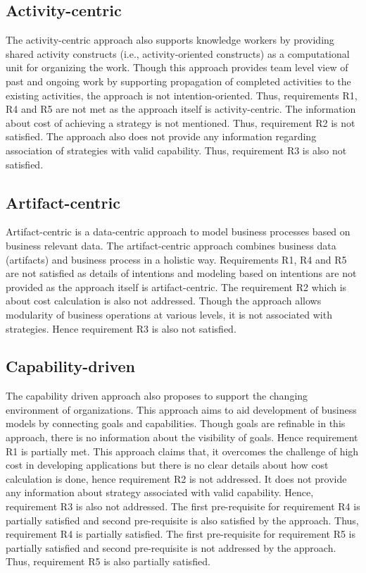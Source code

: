 \subsection{Activity-centric} 
The activity-centric approach also supports knowledge workers by providing shared activity constructs (i.e., activity-oriented constructs) as a computational unit for organizing the work. Though this approach provides team level view of past and ongoing work by supporting propagation of completed activities to the existing activities, the approach is not intention-oriented. Thus, requirements R1, R4 and R5 are not met as the approach itself is activity-centric. The information about cost of achieving a strategy is not mentioned. Thus, requirement R2 is not satisfied. The approach also does not provide any information regarding association of strategies with valid capability. Thus, requirement R3 is also not satisfied.   
 
\subsection{Artifact-centric} 
Artifact-centric is a data-centric approach to model business processes based on business relevant data. The artifact-centric approach combines business data (artifacts) and business process in a holistic way. Requirements R1, R4 and R5 are not satisfied as details of intentions and modeling based on intentions are not provided as the approach itself is artifact-centric. The requirement R2 which is about cost calculation is also not addressed. Though the approach allows modularity of business operations at various levels, it is not associated with strategies. Hence requirement R3 is also not satisfied. 

\subsection{Capability-driven} 
The capability driven approach also proposes to support the changing environment of organizations. This approach aims to aid development of business models by connecting goals and capabilities. Though goals are refinable in this approach, there is no information about the visibility of goals. Hence requirement R1 is partially met. This approach claims that, it overcomes the challenge of high cost in developing applications but there is no clear details about how cost calculation is done, hence requirement R2 is not addressed. It does not provide any information about strategy associated with valid capability. Hence, requirement R3 is also not addressed. The first pre-requisite for requirement R4 is partially satisfied and second pre-requisite is also satisfied by the approach. Thus, requirement R4 is partially satisfied. The first pre-requisite for requirement R5 is partially satisfied and second pre-requisite is not addressed by the approach. Thus, requirement R5 is also partially satisfied. 

